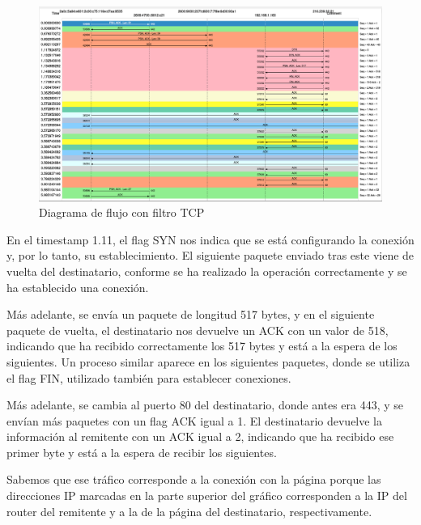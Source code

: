 \documentclass[spanish]{report} %
\begin{document}
\begin{figure}[h]
\begin{center}
\includegraphics[scale=.25]{../img/6.png}
\end{center}
\caption{Diagrama de flujo con filtro TCP}
\end{figure}

En el timestamp 1.11, el flag SYN nos indica que se está configurando la
conexión y, por lo tanto, su establecimiento. El siguiente paquete enviado tras
este viene de vuelta del destinatario, conforme se ha realizado la operación
correctamente y se ha establecido una conexión.\newline

Más adelante, se envía un paquete de longitud 517 bytes, y en el siguiente
paquete de vuelta, el destinatario nos devuelve un ACK con un valor de 518,
indicando que ha recibido correctamente los 517 bytes y está a la espera de los
siguientes. Un proceso similar aparece en los siguientes paquetes, donde
se utiliza el flag FIN, utilizado también para establecer
conexiones.\newline

Más adelante, se cambia al puerto 80 del destinatario, donde antes era 443, y
se envían más paquetes con un flag ACK igual a 1. El destinatario
devuelve la información al remitente con un ACK igual a 2, indicando que ha
recibido ese primer byte y está a la espera de recibir los
siguientes.\newline

Sabemos que ese tráfico corresponde a la conexión con la página porque las
direcciones IP marcadas en la parte superior del gráfico corresponden a la
IP del router del remitente y a la de la página del destinatario,
respectivamente.\newline
\end{document}
